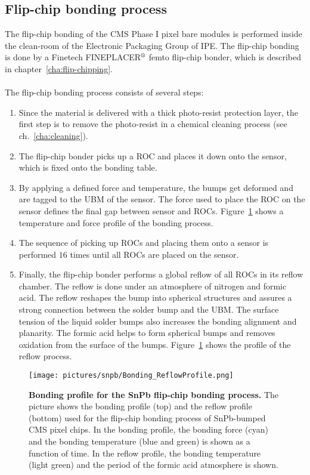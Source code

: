 \subsection{Flip-chip bonding process}\label{sec:SnPb_flip-chip}
The flip-chip bonding of the \ac{CMS} Phase I pixel bare modules is performed inside the clean-room of the Electronic Packaging Group of \ac{IPE}. The flip-chip bonding is done by a Finetech FINEPLACER$\rm{\symbR}$ femto flip-chip bonder, which is described in chapter~\ref{cha:flip-chipping}.\\
\\The flip-chip bonding process consists of several steps:
\begin{enumerate}
\item Since the material is delivered with a thick photo-resist protection layer, the first step is to remove the photo-resist in a chemical cleaning process (see ch.~\ref{cha:cleaning}).
\item The flip-chip bonder picks up a \ac{ROC} and places it down onto the sensor, which is fixed onto the bonding table.
\item By applying a defined force and temperature, the bumps get deformed and are tagged to the \ac{UBM} of the sensor. The force used to place the \ac{ROC} on the sensor defines the final gap between sensor and \ac{ROC}s. Figure~\ref{fig:bonding_profile_SnPb} shows a temperature and force profile of the bonding process.
\item The sequence of picking up \ac{ROC}s and placing them onto a sensor is performed $16$ times until all \ac{ROC}s are placed on the sensor.
\item Finally, the flip-chip bonder performs a global reflow of all \ac{ROC}s in its reflow chamber. The reflow is done under an atmosphere of nitrogen and formic acid. The reflow reshapes the bump into spherical structures and assures a strong connection between the solder bump and the \ac{UBM}. The surface tension of the liquid solder bumps also increases the bonding alignment and planarity. The formic acid helps to form spherical bumps and removes oxidation from the surface of the bumps. Figure~\ref{fig:bonding_profile_SnPb} shows the profile of the reflow process. 
\end{enumerate}
\begin{figure}
\begin{center}
\texttt{[image: pictures/snpb/Bonding\_ReflowProfile.png]}
\end{center}
\caption[Bonding profile for SnPb flip-chip bonding process]{\textbf{Bonding profile for the SnPb flip-chip bonding process.} The picture shows the bonding profile (top) and the reflow profile (bottom) used for the flip-chip bonding process of SnPb-bumped \ac{CMS} pixel chips. In the bonding profile, the bonding force (cyan) and the bonding temperature (blue and green) is shown as a function of time. In the reflow profile, the bonding temperature (light green) and the period of the formic acid atmosphere is shown.}\label{fig:bonding_profile_SnPb}
\end{figure}
